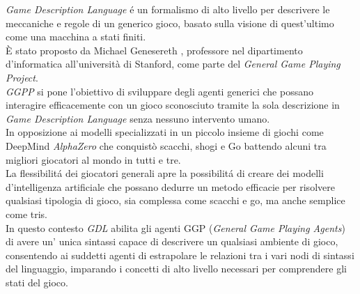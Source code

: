\textit{Game Description Language} é un formalismo di alto livello per descrivere 
le meccaniche e regole di un generico gioco,
basato sulla visione di quest'ultimo come una macchina a stati finiti. \\
È stato proposto da Michael Genesereth \cite{GDLSpecification}, professore nel dipartimento d'informatica
all'università di Stanford, come parte del \textit{General Game Playing Project}. \\ 
\textit{GGPP} si pone l'obiettivo di sviluppare degli agenti generici che possano interagire efficacemente
con un gioco sconosciuto tramite la sola descrizione in \textit{Game Description Language} 
senza nessuno intervento umano. \\
In opposizione ai modelli specializzati in un piccolo insieme di giochi come 
DeepMind \textit{AlphaZero} \cite{AlphaZero} che conquistò scacchi, 
shogi e Go battendo alcuni tra migliori giocatori al mondo in tutti e tre. \\
La flessibilitá dei giocatori generali apre la possibilitá di creare dei modelli 
d'intelligenza artificiale 
che possano dedurre un metodo efficacie per risolvere qualsiasi tipologia di gioco,
sia complessa come scacchi e go, ma anche semplice come tris. \\
In questo contesto \textit{GDL} abilita gli agenti GGP (\textit{General Game Playing Agents}) di avere un' 
unica sintassi capace di descrivere un qualsiasi ambiente di gioco, consentendo 
ai suddetti agenti di estrapolare le relazioni tra i vari nodi di sintassi del linguaggio,
imparando i concetti di alto livello necessari per comprendere gli stati del gioco.

